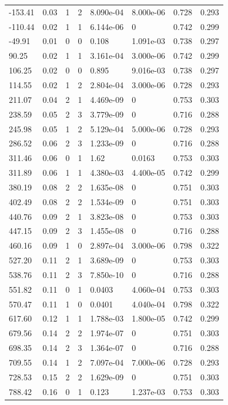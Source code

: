 \documentclass[preview]{standalone}
\begin{document}
{{\begin{tabular}{L{1.2cm}C{1.2cm} C{0.3cm}C{0.5cm} C{1.4cm}C{1.4cm} C{1.4cm}C{1.4cm}}
  -153.41  &  0.03  & 1     &  2 &  8.090e-04  & 8.000e-06  & 0.728 &  0.293   \\ 
  -110.44  &  0.02  & 1     &  1 &  6.144e-06  & 0  & 0.742 &  0.299   \\ 
  -49.91  &  0.01  & 0     &  0 &  0.108  & 1.091e-03  & 0.738 &  0.297   \\ 
  90.25  &  0.02  & 1     &  1 &  3.161e-04  & 3.000e-06  & 0.742 &  0.299   \\ 
  106.25  &  0.02  & 0     &  0 &  0.895  & 9.016e-03  & 0.738 &  0.297   \\ 
  114.55  &  0.02  & 1     &  2 &  2.804e-04  & 3.000e-06  & 0.728 &  0.293   \\ 
  211.07  &  0.04  & 2     &  1 &  4.469e-09  & 0  & 0.753 &  0.303   \\ 
  238.59  &  0.05  & 2     &  3 &  3.779e-09  & 0  & 0.716 &  0.288   \\ 
  245.98  &  0.05  & 1     &  2 &  5.129e-04  & 5.000e-06  & 0.728 &  0.293   \\ 
  286.52  &  0.06  & 2     &  3 &  1.233e-09  & 0  & 0.716 &  0.288   \\ 
  311.46  &  0.06  & 0     &  1 &  1.62  & 0.0163  & 0.753 &  0.303   \\ 
  311.89  &  0.06  & 1     &  1 &  4.380e-03  & 4.400e-05  & 0.742 &  0.299   \\ 
  380.19  &  0.08  & 2     &  2 &  1.635e-08  & 0  & 0.751 &  0.303   \\ 
  402.49  &  0.08  & 2     &  2 &  1.534e-09  & 0  & 0.751 &  0.303   \\ 
  440.76  &  0.09  & 2     &  1 &  3.823e-08  & 0  & 0.753 &  0.303   \\ 
  447.15  &  0.09  & 2     &  3 &  1.455e-08  & 0  & 0.716 &  0.288   \\ 
  460.16  &  0.09  & 1     &  0 &  2.897e-04  & 3.000e-06  & 0.798 &  0.322   \\ 
  527.20  &  0.11  & 2     &  1 &  3.689e-09  & 0  & 0.753 &  0.303   \\ 
  538.76  &  0.11  & 2     &  3 &  7.850e-10  & 0  & 0.716 &  0.288   \\ 
  551.82  &  0.11  & 0     &  1 &  0.0403  & 4.060e-04  & 0.753 &  0.303   \\ 
  570.47  &  0.11  & 1     &  0 &  0.0401  & 4.040e-04  & 0.798 &  0.322   \\ 
  617.60  &  0.12  & 1     &  1 &  1.788e-03  & 1.800e-05  & 0.742 &  0.299   \\ 
  679.56  &  0.14  & 2     &  2 &  1.974e-07  & 0  & 0.751 &  0.303   \\ 
  698.35  &  0.14  & 2     &  3 &  1.364e-07  & 0  & 0.716 &  0.288   \\ 
  709.55  &  0.14  & 1     &  2 &  7.097e-04  & 7.000e-06  & 0.728 &  0.293   \\ 
  728.53  &  0.15  & 2     &  2 &  1.629e-09  & 0  & 0.751 &  0.303   \\ 
  788.42  &  0.16  & 0     &  1 &  0.123  & 1.237e-03  & 0.753 &  0.303   \\ 
\hline 
\end{tabular} 

}}
\end{document}
